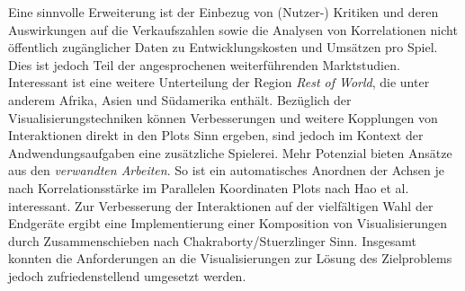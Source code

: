 \documentclass[usegeometry=true]{scrartcl}
\begin{document}
Eine sinnvolle Erweiterung ist der Einbezug von (Nutzer-) Kritiken und deren Auswirkungen auf die Verkaufszahlen 
sowie die Analysen von Korrelationen nicht öffentlich zugänglicher Daten zu Entwicklungskosten und Umsätzen pro Spiel.
Dies ist jedoch Teil der angesprochenen weiterführenden Marktstudien.
Interessant ist eine weitere Unterteilung der Region \textit{Rest of World}, die unter anderem Afrika, Asien und Südamerika enthält.
Bezüglich der Visualisierungstechniken können Verbesserungen und weitere Kopplungen von Interaktionen direkt in den Plots Sinn ergeben, 
sind jedoch im Kontext der Andwendungsaufgaben eine zusätzliche Spielerei.
Mehr Potenzial bieten Ansätze aus den \textit{verwandten Arbeiten}. 
So ist ein automatisches Anordnen der Achsen je nach Korrelationsstärke im Parallelen Koordinaten Plots nach Hao et al. interessant.\cite{Hao.2007}
Zur Verbesserung der Interaktionen auf der vielfältigen Wahl der Endgeräte ergibt eine Implementierung einer Komposition von Visualisierungen durch Zusammenschieben nach Chakraborty/Stuerzlinger Sinn.\cite{Chakraborty.2021}
Insgesamt konnten die Anforderungen an die Visualisierungen zur Lösung des Zielproblems jedoch zufriedenstellend umgesetzt werden.
\newpage
\end{document}
